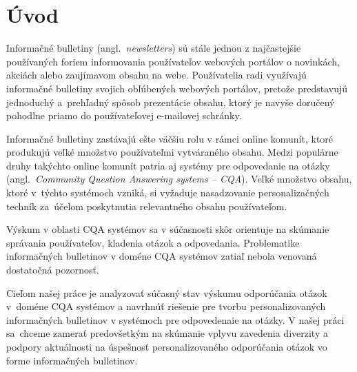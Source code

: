 \newpage
\chapter{Úvod}

Informačné bulletiny (angl.~\emph{newsletters}) sú stále jednou z najčastejšie používaných foriem informovania používateľov
webových portálov o novinkách, akciách alebo zaujímavom obsahu na webe. Používatelia radi využívajú informačné bulletiny
svojich obľúbených webových portálov, pretože predstavujú jednoduchý a~prehľadný spôsob prezentácie obsahu, ktorý je navyše
doručený pohodlne priamo do používateľovej e-mailovej schránky.

Informačné bulletiny zastávajú ešte väčšiu rolu v rámci online komunít, ktoré produkujú veľké množstvo používateľmi
vytváraného obsahu. Medzi populárne druhy takýchto online komunít patria aj systémy pre odpovedanie na otázky
(angl.~\emph{Community Question Answering systems -- CQA}). Veľké množstvo obsahu, ktoré v~týchto systémoch vzniká,
si vyžaduje nasadzovanie personalizačných techník za~účelom poskytnutia relevantného obsahu používateľom.

Výskum v oblasti CQA systémov sa v súčasnosti skôr orientuje na skúmanie správania používateľov, kladenia otázok a odpovedania.
Problematike informačných bulletinov v doméne CQA systémov zatiaľ nebola venovaná dostatočná pozornosť.

Cieľom našej práce je analyzovať súčasný stav výskumu odporúčania otázok v~doméne CQA systémov a navrhnúť riešenie pre
tvorbu personalizovaných informačných bulletinov v systémoch pre odpovedenaie na otázky. V našej práci sa~chceme zamerať
predovšetkým na skúmanie vplyvu zavedenia diverzity a podpory aktuálnosti na úspešnosť personalizovaného odporúčania
otázok vo forme informačných bulletinov.
